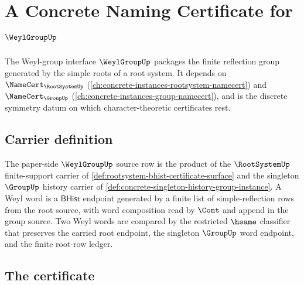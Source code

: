 \chapter{A Concrete Naming Certificate for $\WeylGroupUp$}
\label{ch:concrete-instances-weylgroup-namecert}

The Weyl-group interface $\WeylGroupUp$ packages the finite reflection group generated by the simple roots of a root system. It depends on $\NameCert_{\RootSystemUp}$ (\autoref{ch:concrete-instances-rootsystem-namecert}) and $\NameCert_{\GroupUp}$ (\autoref{ch:concrete-instances-group-namecert}), and is the discrete symmetry datum on which character-theoretic certificates rest.

\section{Carrier definition}
\label{sec:weylgroup-carrier}

\begin{definition}
\label{def:weylgroup-bhist-source-row}
The paper-side $\WeylGroupUp$ source row is the product of the
$\RootSystemUp$ finite-support carrier of
\autoref{def:rootsystem-bhist-certificate-surface} and the singleton
$\GroupUp$ history carrier of
\autoref{def:concrete-singleton-history-group-instance}. A Weyl word is a
$\mathsf{BHist}$ endpoint generated by a finite list of simple-reflection rows
from the root source, with word composition read by $\Cont$ and append in the
group source. Two Weyl words are compared by the restricted $\hsame$
classifier that preserves the carried root endpoint, the singleton
$\GroupUp$ word endpoint, and the finite root-row ledger.
\end{definition}

\section{The certificate}
\label{sec:weylgroup-certificate}

